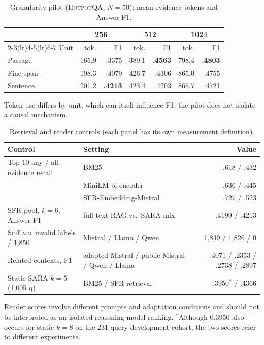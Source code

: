 \documentclass[10pt,twocolumn,letterpaper]{article}
\newcommand{\hotpot}{\textsc{HotpotQA}\xspace}
\newcommand{\scifact}{\textsc{SciFact}\xspace}
\begin{document}
\begin{table}[H]\centering\small\setlength{\tabcolsep}{5pt}
\caption{Granularity pilot (\hotpot, $N{=}50$): mean evidence tokens and Answer F1.}\label{tab:gran}
\begin{tabular}{lrrrrrr}\toprule
& \multicolumn{2}{c}{256} & \multicolumn{2}{c}{512} & \multicolumn{2}{c}{1024}\\\cmidrule(lr){2-3}\cmidrule(lr){4-5}\cmidrule(lr){6-7}
Unit & tok. & F1 & tok. & F1 & tok. & F1\\\midrule
Passage & 165.9 & .3375 & 389.1 & \textbf{.4563} & 798.4 & \textbf{.4803}\\
Fine span & 198.3 & .4079 & 426.7 & .4306 & 865.0 & .4755\\
Sentence & 201.2 & \textbf{.4213} & 423.4 & .4203 & 866.7 & .4721\\\bottomrule
\end{tabular}\end{table}
Token use differs by unit, which can itself influence F1; the pilot does not isolate a causal mechanism.

\begin{table}[H]\centering\small\setlength{\tabcolsep}{5pt}
\caption{Retrieval and reader controls (each panel has its own measurement definition).}\label{tab:ctl}
\begin{tabular}{llr}\toprule
Control & Setting & Value\\\midrule
Top-10 any / all-evidence recall & BM25 & .618 / .432\\
 & MiniLM bi-encoder & .636 / .445\\
 & SFR-Embedding-Mistral & .727 / .523\\
SFR pool, $k{=}6$, Answer F1 & full-text RAG vs.\ SARA mix & .4199 / .4213\\
\scifact invalid labels / 1,850 & Mistral / Llama / Qwen & 1,849 / 1,826 / 0\\
Related contexts, F1 & adapted Mistral / public Mistral / Qwen / Llama & .4071 / .2353 / .2738 / .2897\\
Static SARA $k{=}5$ (1,005 q) & BM25 / SFR retrieval & .3950$^\ast$ / .4366\\\bottomrule
\end{tabular}\end{table}
Reader scores involve different prompts and adaptation conditions and should not be interpreted as an isolated reasoning-model ranking. $^\ast$Although 0.3950 also occurs for static $k{=}8$ on the 231-query development cohort, the two scores refer to different experiments.
\end{document}
